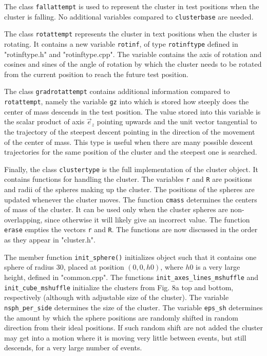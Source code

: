 \documentclass[12pt]{article}
\begin{document}
The class \texttt{fallattempt} is used to represent the cluster in test positions when the cluster is falling. No additional variables compared to \texttt{clusterbase} are needed.

The class \texttt{rotattempt} represents the cluster in text positions when the cluster is rotating. It contains a new variable \texttt{rotinf}, of type \texttt{rotinftype} defined in "rotinftype.h" and "rotinftype.cpp". The variable contains the axis of rotation and cosines and sines of the angle of rotation by which the cluster needs to be rotated from the current position to reach the future test position.

The class \texttt{gradrotattempt} contains additional information compared to \texttt{rotattempt}, namely the variable \texttt{gz} into which is stored how steeply does the center of mass descends in the test position. The value stored into this variable is the scalar product of axis $\vec e_z$ pointing upwards and the unit vector tangential to the trajectory of the steepest descent pointing in the direction of the movement of the center of mass. This type is useful when there are many possible descent trajectories for the same position of the cluster and the steepest one is searched. 

Finally, the class \texttt{clustertype} is the full implementation of the cluster object. It contains functions for handling the cluster. The variables \texttt{r} and \texttt{R} are positions and radii of the spheres making up the cluster. The positions of the spheres are updated whenever the cluster moves. The function \texttt{cmass} determines the centers of mass of the cluster. It can be used only when the cluster spheres are non-overlapping, since otherwise it will likely give an incorrect value. The function \texttt{erase} empties the vectors \texttt{r} and \texttt{R}. The functions are now discussed in the order as they appear in "cluster.h". 

The member function \texttt{init\_sphere()} initializes object such that it contains one sphere of radius 30, placed at position $(0,0,h0)$, where $h0$ is a very large height, defined in "common.cpp". The functions \texttt{init\_axes\_lines\_mshuffle} and \texttt{init\_cube\_mshuffle} initialize the clusters from Fig. 8a top and bottom, respectively (although with adjustable size of the cluster). The variable \texttt{nsph\_per\_side} determines the size of the cluster. The variable \texttt{eps\_sh} determines the amount by which the sphere positions are randomly shifted in random direction from their ideal positions. If such random shift are not added the cluster may get into a motion where it is moving very little between events, but still descends, for a very large number of events.
\end{document}
